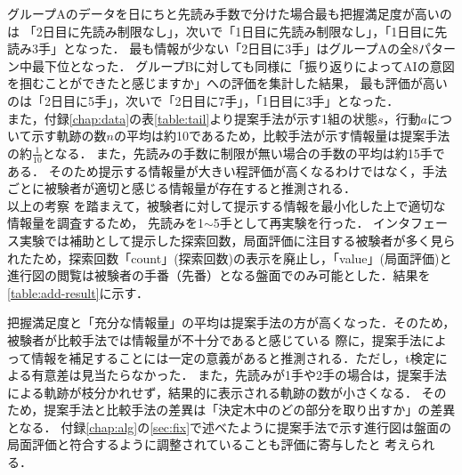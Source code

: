 グループAのデータを日にちと先読み手数で分けた場合最も把握満足度が高いのは
「2日目に先読み制限なし」，次いで「1日目に先読み制限なし」，「1日目に先読み3手」となった．
最も情報が少ない「2日目に3手」はグループAの全8パターン中最下位となった．
グループBに対しても同様に「振り返りによってAIの意図を掴むことができたと感じますか」への評価を集計した結果，
最も評価が高いのは「2日目に5手」，次いで「2日目に7手」，「1日目に3手」となった．\\
また，付録\ref{chap:data}の表\ref{table:tail}より提案手法が示す1組の状態$s$，行動$a$について示す軌跡の数$n$の平均は約10であるため，比較手法が示す情報量は提案手法の約$\frac{1}{10}$となる．
また，先読みの手数に制限が無い場合の手数の平均は約15手である．
そのため提示する情報量が大きい程評価が高くなるわけではなく，手法ごとに被験者が適切と感じる情報量が存在すると推測される．\\
以上の考察
を踏まえて，被験者に対して提示する情報を最小化した上で適切な情報量を調査するため，
先読みを1$\sim$5手として再実験を行った．
インタフェース実験では補助として提示した探索回数，局面評価に注目する被験者が多く見られたため，探索回数「count」(探索回数)の表示を廃止し，「value」(局面評価)と進行図の閲覧は被験者の手番（先番）となる盤面でのみ可能とした．結果を\ref{table:add-result}に示す．

\begin{table}[H]
    \caption{先読み手数制限なしの場合(追加実験)}
    \label{table:add-result}
    \scriptsize
    \centering
    
\end{table}


把握満足度と「充分な情報量」の平均は提案手法の方が高くなった．そのため，被験者が比較手法では情報量が不十分であると感じている
際に，提案手法によって情報を補足することには一定の意義があると推測される．ただし，t検定による有意差は見当たらなかった．
また，先読みが1手や2手の場合は，提案手法による軌跡が枝分かれせず，結果的に表示される軌跡の数が小さくなる．
そのため，提案手法と比較手法の差異は「決定木中のどの部分を取り出すか」の差異となる．
付録\ref{chap:alg}の\ref{sec:fix}で述べたように提案手法で示す進行図は盤面の局面評価と符合するように調整されていることも評価に寄与したと
考えられる．